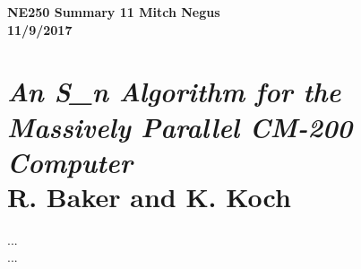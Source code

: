 \documentclass{report}
\newcommand{\tab}{\-\hspace{1cm}}
\begin{document}
\thispagestyle{empty}

{\bf {\large {NE250 Summary {11} \hfill Mitch Negus\\
		\hspace*{\fill} 11/9/2017\\ }}}
\section*{\textsl{An S_n Algorithm for the Massively Parallel CM-200 Computer} \\ \normalsize R. Baker and K. Koch}

\tab ...  \\
\tab ...
\end{document}
